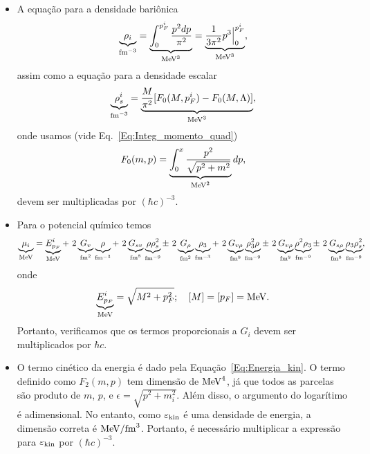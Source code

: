 \begin{fullwidth}
\begin{itemize}
\item A equação para a densidade bariônica
\begin{equation}
	\underbrace{\rho_i}_{\rm{fm}^{-3}} = \underbrace{\int_0^{p_F^i} \frac{p^2 dp}{\pi^2}}_{\rm{MeV}^3} = \underbrace{\frac{1}{3\pi^2}p^3\Big|_0^{p_F^i}}_{\rm{MeV}^3},
\end{equation}
%
assim como a equação para a densidade escalar
\begin{equation}
	\underbrace{\rho_s^i}_{\rm{fm}^{-3}} = \underbrace{\frac{M}{\pi^2}[F_0(M,p_F^i) - F_0(M, \Lambda)]}_{\rm{MeV}^3},
\end{equation}
%
onde usamos (vide Eq.~\eqref{Eq:Integ_momento_quad})
\begin{equation}
	F_0(m,p) = \underbrace{\int_0^x \frac{p^2}{\sqrt{p^2 + m^2}}}_{\rm{MeV}^2} dp,
\end{equation}
%
devem ser multiplicadas por $(\hbar c)^{-3}$.

\item Para o potencial químico temos
\begin{equation}
	\underbrace{\mu_i}_{\rm{MeV}} = \underbrace{E_{p_F}^i}_{\rm{MeV}} +~2 \underbrace{G_v}_{\rm{fm}^2}\underbrace{\rho}_{\rm{fm^{-3}}} +~2 \underbrace{G_{sv}}_{\rm{fm}^8}\underbrace{\rho\rho_s^2}_{\rm{fm^{-9}}} \pm~2 \underbrace{G_\rho}_{\rm{fm}^2}\underbrace{\rho_3}_{\rm{fm^{-3}}} +~2 \underbrace{G_{v\rho}}_{\rm{fm}^8}\underbrace{\rho_3^2\rho}_{\rm{fm^{-9}}} \pm~2 \underbrace{G_{v\rho}}_{\rm{fm}^8}\underbrace{\rho^2\rho_3}_{\rm{fm^{-9}}} \pm~2
\underbrace{G_{s\rho}}_{\rm{fm}^8}\underbrace{\rho_3\rho_s^2}_{\rm{fm^{-9}}},
\end{equation}
%
onde
\begin{equation}
	\underbrace{E_{p_F}^i}_{\rm{MeV}} = \sqrt{M^2 + p_F^2}; \quad [M] = [p_F] = \rm{MeV}.
\end{equation}
%
Portanto, verificamos que os termos proporcionais a $G_i$ devem ser multiplicados por $\hbar c$.

\item O termo cinético da energia é dado pela Equação~\eqref{Eq:Energia_kin}. O termo definido como $F_2(m, p)$ tem dimensão de $\rm{MeV}^4$, já que todos as parcelas são produto de $m$, $p$, e $\epsilon = \sqrt{p^2+m_i^2}$. Além disso, o argumento do logarítimo é adimensional. No entanto, como $\varepsilon_{\rm{kin}}$ é uma densidade de energia, a dimensão correta é $\rm{MeV} / \rm{fm}^3$. Portanto, é necessário multiplicar a expressão para $\varepsilon_{\rm{kin}}$ por $(\hbar c)^{-3}$.
\end{itemize}
\end{fullwidth}

